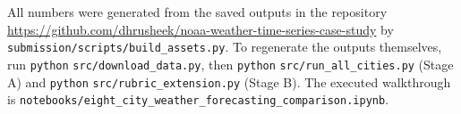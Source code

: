 \documentclass[11pt,a4paper]{article}
\newcommand{\code}[1]{\texttt{#1}}
\begin{document}
\noindent All numbers were generated from the saved outputs in the repository \url{https://github.com/dhrusheek/noaa-weather-time-series-case-study} by \nolinkurl{submission/scripts/build_assets.py}. To regenerate the outputs themselves, run \code{python} \nolinkurl{src/download_data.py}, then \code{python} \nolinkurl{src/run_all_cities.py} (Stage A) and \code{python} \nolinkurl{src/rubric_extension.py} (Stage B). The executed walkthrough is \nolinkurl{notebooks/eight_city_weather_forecasting_comparison.ipynb}.
\end{document}
